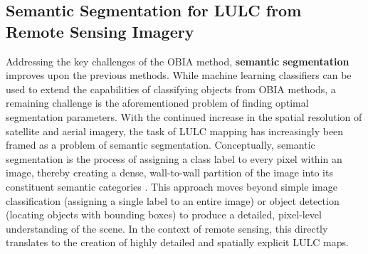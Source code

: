 \documentclass{report}
\begin{document}
\subsection{Semantic Segmentation for LULC from Remote Sensing Imagery}
Addressing the key challenges of the OBIA method, \textbf{semantic segmentation} improves upon the previous methods. While machine learning classifiers can be used to extend the capabilities of classifying objects from OBIA methods, a remaining challenge is the aforementioned problem of finding optimal segmentation parameters. With the continued increase in the spatial resolution of satellite and aerial imagery, the task of LULC mapping has increasingly been framed as a problem of semantic segmentation. Conceptually, semantic segmentation is the process of assigning a class label to every pixel within an image, thereby creating a dense, wall-to-wall partition of the image into its constituent semantic categories \parencites[p.~311;]{KotaridisLazaridouRemotesensingimagesegmentationadvancesmetaanalysis2021a}[p.~2]{LeiEtAlDeeplearningimplementationimagesegmentationagriculturalapplicationscomprehensivereview2024}. This approach moves beyond simple image classification (assigning a single label to an entire image) or object detection (locating objects with bounding boxes) to produce a detailed, pixel-level understanding of the scene. In the context of remote sensing, this directly translates to the creation of highly detailed and spatially explicit LULC maps.
\end{document}
